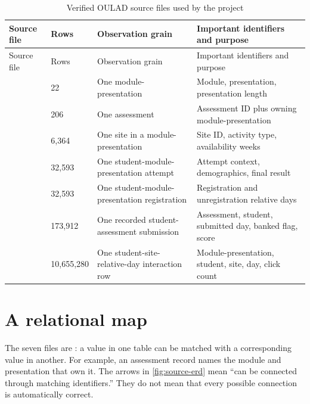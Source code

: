 \small
\begin{longtable}{L{0.19\textwidth}L{0.13\textwidth}L{0.26\textwidth}L{0.31\textwidth}}
\caption{Verified OULAD source files used by the project}\label{tab:source-files}\\
\toprule
Source file & Rows & Observation grain & Important identifiers and purpose \\
\midrule
\endfirsthead
\toprule
Source file & Rows & Observation grain & Important identifiers and purpose \\
\midrule
\endhead
{\scriptsize{}} & 22 & One module-presentation & Module, presentation, presentation length \\
{\scriptsize{}} & 206 & One assessment & Assessment ID plus owning module-presentation \\
{\scriptsize{}} & 6,364 & One site in a module-presentation & Site ID, activity type, availability weeks \\
{\scriptsize{}} & 32,593 & One student-module-presentation attempt & Attempt context, demographics, final result \\
{} & 32,593 & One student-module-presentation registration & Registration and unregistration relative days \\
{\scriptsize{}} & 173,912 & One recorded student-assessment submission & Assessment, student, submitted day, banked flag, score \\
{\scriptsize{}} & 10,655,280 & One student-site-relative-day interaction row & Module-presentation, student, site, day, click count \\
\bottomrule
\end{longtable}
\normalsize


\section{A relational map}

The seven files are : a value in one table can be matched with a
corresponding value in another. For example, an assessment record names the
module and presentation that own it. The arrows in
\cref{fig:source-erd} mean ``can be connected through matching identifiers.''
They do not mean that every possible connection is automatically correct.

